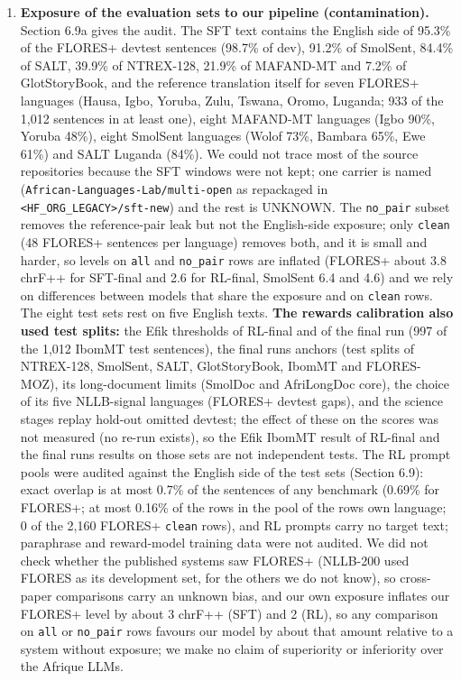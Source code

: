 \begin{enumerate}
\def\labelenumi{\arabic{enumi}.}
\tightlist
\item
  \textbf{Exposure of the evaluation sets to our pipeline (contamination).} Section 6.9a gives the audit. The SFT text contains the English side of 95.3\% of the FLORES+ devtest sentences (98.7\% of dev), 91.2\% of SmolSent, 84.4\% of SALT, 39.9\% of NTREX-128, 21.9\% of MAFAND-MT and 7.2\% of GlotStoryBook, and the reference translation itself for seven FLORES+ languages (Hausa, Igbo, Yoruba, Zulu, Tswana, Oromo, Luganda; 933 of the 1,012 sentences in at least one), eight MAFAND-MT languages (Igbo 90\%, Yoruba 48\%), eight SmolSent languages (Wolof 73\%, Bambara 65\%, Ewe 61\%) and SALT Luganda (84\%). We could not trace most of the source repositories because the SFT windows were not kept; one carrier is named (\texttt{African-Languages-Lab/multi-open} as repackaged in \texttt{<HF_ORG_LEGACY>/sft-new}) and the rest is UNKNOWN. The \texttt{no\_pair} subset removes the reference-pair leak but not the English-side exposure; only \texttt{clean} (48 FLORES+ sentences per language) removes both, and it is small and harder, so levels on \texttt{all} and \texttt{no\_pair} rows are inflated (FLORES+ about 3.8 chrF++ for SFT-final and 2.6 for RL-final, SmolSent 6.4 and 4.6) and we rely on differences between models that share the exposure and on \texttt{clean} rows. The eight test sets rest on five English texts. \textbf{The reward\textquotesingle s calibration also used test splits:} the Efik thresholds of RL-final and of the final run (997 of the 1,012 IbomMT test sentences), the final run\textquotesingle s anchors (test splits of NTREX-128, SmolSent, SALT, GlotStoryBook, IbomMT and FLORES-MOZ), its long-document limits (SmolDoc and AfriLongDoc core), the choice of its five NLLB-signal languages (FLORES+ devtest gaps), and the science stage\textquotesingle s replay hold-out omitted devtest; the effect of these on the scores was not measured (no re-run exists), so the Efik IbomMT result of RL-final and the final run\textquotesingle s results on those sets are not independent tests. The RL prompt pools were audited against the English side of the test sets (Section 6.9): exact overlap is at most 0.7\% of the sentences of any benchmark (0.69\% for FLORES+; at most 0.16\% of the rows in the pool of the row\textquotesingle s own language; 0 of the 2,160 FLORES+ \texttt{clean} rows), and RL prompts carry no target text; paraphrase and reward-model training data were not audited. We did not check whether the published systems saw FLORES+ (NLLB-200 used FLORES as its development set, for the others we do not know), so cross-paper comparisons carry an unknown bias, and our own exposure inflates our FLORES+ level by about 3 chrF++ (SFT) and 2 (RL), so any comparison on \texttt{all} or \texttt{no\_pair} rows favours our model by about that amount relative to a system without exposure; we make no claim of superiority or inferiority over the Afrique LLMs.

\end{enumerate}
